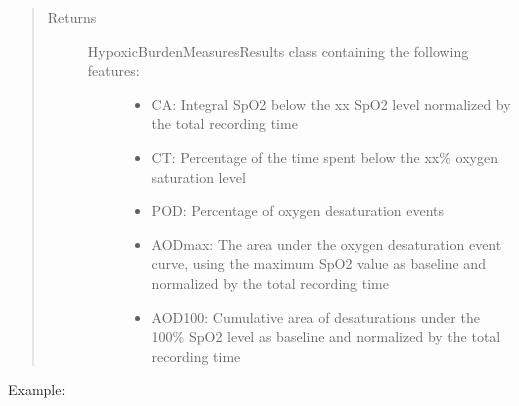 \documentclass[letterpaper,10pt,english]{sphinxmanual}
\begin{document}
\begin{fulllineitems}
\begin{fulllineitems}
\begin{quote}
\begin{description}
\item[{Returns}] \leavevmode
\begin{description}
\item[{HypoxicBurdenMeasuresResults class containing the following features:}] \leavevmode\begin{itemize}
\item {} 
CA: Integral SpO2 below the xx SpO2 level normalized by the total recording time

\item {} 
CT: Percentage of the time spent below the xx\% oxygen saturation level

\item {} 
POD: Percentage of oxygen desaturation events

\item {} 
AODmax: The area under the oxygen desaturation event curve, using the maximum SpO2 value as baseline
and normalized by the total recording time

\item {} 
AOD100: Cumulative area of desaturations under the 100\% SpO2 level as baseline and normalized
by the total recording time

\end{itemize}

\end{description}


\end{description}\end{quote}

Example:

\begin{sphinxVerbatim}[commandchars=\\\{\}]
   

     

  
\end{sphinxVerbatim}

\end{fulllineitems}


\end{fulllineitems}
\end{document}
